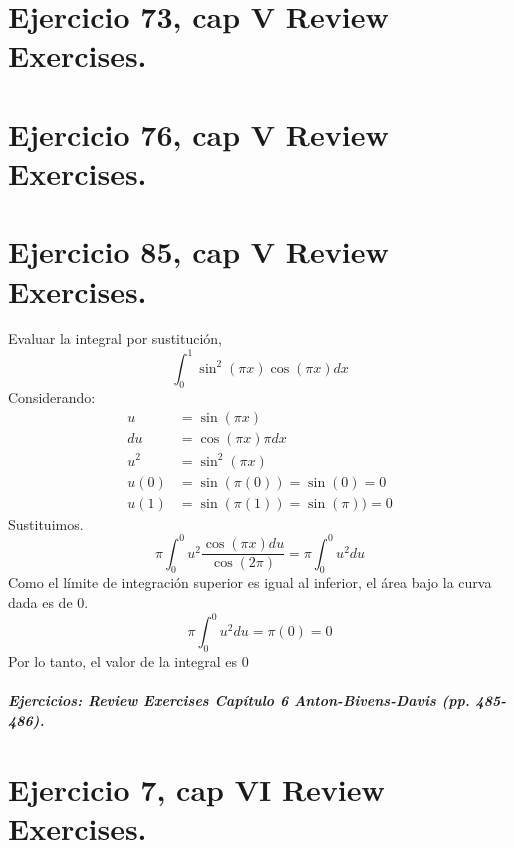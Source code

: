 \documentclass[11pt,letterpaper]{article}
\begin{document}
\section{Ejercicio 73, cap V Review Exercises.}

\section{Ejercicio 76, cap V Review Exercises.}

\section{Ejercicio 85, cap V Review Exercises.}
Evaluar la integral por sustitución,
\begin{equation*}
  \int_0^1\sin^2(\pi x)\cos(\pi x)dx
\end{equation*}
Considerando:
\begin{equation*}
  \begin{split}
    u &= \sin(\pi x)\\
    du &= \cos(\pi x)\pi dx\\
    u^2 &= \sin^2(\pi x)\\
    u(0)&=\sin(\pi (0))=\sin(0)=0\\
    u(1) &= \sin(\pi (1)) = \sin(\pi))=0
  \end{split}
\end{equation*}
Sustituimos.
\begin{equation*}
  \pi \int_0^0u^2 \frac{\cos(\pi x)du}{\cos(2\pi)} = \pi \int_0^0 u^2du
\end{equation*}
Como el límite de integración superior es igual al inferior, el área bajo la curva dada es de 0.
\begin{equation*}
  \pi \int_0^0 u^2du = \pi (0) = 0
\end{equation*}
Por lo tanto, el valor de la integral es 0


\subparagraph{Ejercicios: Review Exercises Capítulo 6 Anton-Bivens-Davis (pp. 485-486).}

\section{Ejercicio 7, cap VI Review Exercises.}
\end{document}
